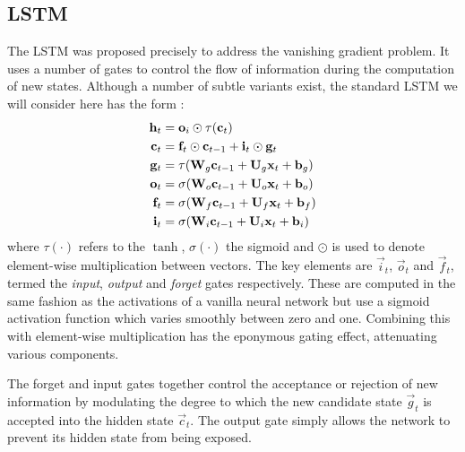 \subsection{LSTM}
The LSTM was proposed precisely to address the vanishing gradient problem. It uses a number of gates
to control the flow of information during the computation of new states. Although a number
of subtle variants exist, the standard LSTM we will consider here has the form
\autocite{Hochreiter1997, Graves2013}:
\begin{align}\label{eq:LSTM}
	\mathbf{h}_t &= \mathbf{o}_i \odot \tau(\mathbf{c}_t)\\
	\mathbf{c}_t &= \mathbf{f}_t \odot \mathbf{c}_{t-1} + \mathbf{i}_t \odot \mathbf{g}_t\\
	\mathbf{g}_t &= \tau(\mathbf{W}_g \mathbf{c}_{t-1} + \mathbf{U}_g \mathbf{x}_t + \mathbf{b}_g)\\
	\mathbf{o}_t &= \sigma(\mathbf{W}_o \mathbf{c}_{t-1} + \mathbf{U}_o \mathbf{x}_t + \mathbf{b}_o)\\
	\mathbf{f}_t &= \sigma(\mathbf{W}_f \mathbf{c}_{t-1} + \mathbf{U}_f \mathbf{x}_t + \mathbf{b}_f)\\
	\mathbf{i}_t &= \sigma(\mathbf{W}_i \mathbf{c}_{t-1} + \mathbf{U}_i \mathbf{x}_t + \mathbf{b}_i)
\end{align} where \(\tau(\cdot)\) refers to the \(\tanh\), \(\sigma(\cdot)\) the
sigmoid and \(\odot\)
is used to denote element-wise multiplication between vectors. 
The key elements are \(\vec{i}_t\), \(\vec{o}_t\) and \(\vec{f}_t\), termed the
\emph{input}, \emph{output} and \emph{forget} gates respectively. These are computed in the same fashion
as the activations of a vanilla neural network but use a sigmoid activation function which varies
smoothly between zero and one. Combining this with element-wise multiplication has the eponymous
gating effect, attenuating various components. 

The forget and input gates together control the acceptance or rejection of new information by 
modulating the
degree to which the new candidate state \(\vec{g}_t\) is accepted into the hidden state
\(\vec{c}_t\). The output gate simply allows the network to prevent its hidden
state from being exposed. 


